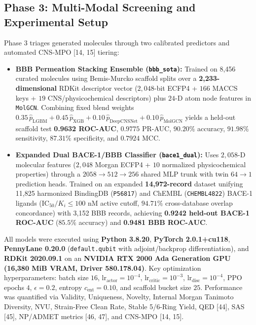 \documentclass[10pt,a4paper]{article}
\begin{document}
\subsection{Phase 3: Multi-Modal Screening and Experimental Setup}
Phase 3 triages generated molecules through two calibrated predictors and automated CNS-MPO [14, 15] tiering:
\begin{itemize}[noitemsep]
    \item \textbf{BBB Permeation Stacking Ensemble (\texttt{bbb\_sota}):} Trained on 8,456 curated molecules using Bemis-Murcko scaffold splits over a \textbf{2,233-dimensional} RDKit descriptor vector ($2,048$-bit ECFP4 + $166$ MACCS keys + $19$ CNS/physicochemical descriptors) plus $24$-D atom node features in \texttt{MolGCN}. Combining fixed blend weights $0.35\,\hat{p}_{\text{LGBM}} + 0.45\,\hat{p}_{\text{XGB}} + 0.10\,\hat{p}_{\text{DeepCNSNet}} + 0.10\,\hat{p}_{\text{MolGCN}}$ yields a held-out scaffold test \textbf{0.9632 ROC-AUC}, $0.9775$ PR-AUC, $90.20\%$ accuracy, $91.98\%$ sensitivity, $87.31\%$ specificity, and $0.7924$ MCC.
    \item \textbf{Expanded Dual BACE-1/BBB Classifier (\texttt{bace1\_dual}):} Uses $2,058$-D molecular features ($2,048$ Morgan ECFP4 + $10$ normalized physicochemical properties) through a $2058 \to 512 \to 256$ shared MLP trunk with twin $64 \to 1$ prediction heads. Trained on an expanded \textbf{14,972-record} dataset unifying 11,825 harmonized BindingDB (\texttt{P56817}) and ChEMBL (\texttt{CHEMBL4822}) BACE-1 ligands ($\mathrm{IC}_{50}/K_i \le 100\text{ nM}$ active cutoff, $94.71\%$ cross-database overlap concordance) with 3,152 BBB records, achieving \textbf{0.9242 held-out BACE-1 ROC-AUC} ($85.5\%$ accuracy) and \textbf{0.9481 BBB ROC-AUC}.
\end{itemize}
All models were executed using \textbf{Python 3.8.20}, \textbf{PyTorch 2.0.1+cu118}, \textbf{PennyLane 0.20.0} (\texttt{default.qubit} with adjoint/backprop differentiation), and \textbf{RDKit 2020.09.1} on an \textbf{NVIDIA RTX 2000 Ada Generation GPU (16,380 MiB VRAM, Driver 580.178.04)}. Key optimization hyperparameters: batch size $16$, $\text{lr}_{\text{actor}} = 10^{-4}$, $\text{lr}_{\text{critic}} = 10^{-3}$, $\text{lr}_{\text{disc}} = 10^{-4}$, PPO epochs $4$, $\epsilon = 0.2$, entropy $c_{\text{ent}} = 0.10$, and scaffold bucket size $25$. Performance was quantified via Validity, Uniqueness, Novelty, Internal Morgan Tanimoto Diversity, NVU, Strain-Free Clean Rate, Stable 5/6-Ring Yield, QED [44], SAS [45], NP/ADMET metrics [46, 47], and CNS-MPO [14, 15].
\end{document}
